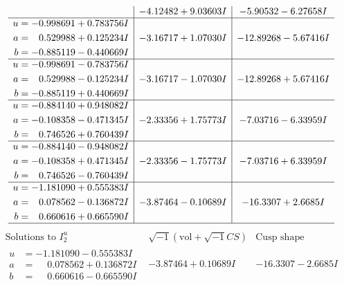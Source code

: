 \documentclass[1p]{elsarticle_modified}
\theoremstyle{definition}
\newcommand{\I}{\sqrt{-1}}
\begin{document}
$$\begin{array}{c|c|c}
 & -4.12482 + 9.03603 I & -5.90532 - 6.27658 I \\ \hline\begin{aligned}
u &= -0.998691 + 0.783756 I \\
a &= \phantom{-}0.529988 + 0.125234 I \\
b &= -0.885119 - 0.440669 I\end{aligned}
 & -3.16717 + 1.07030 I & -12.89268 - 5.67416 I \\ \hline\begin{aligned}
u &= -0.998691 - 0.783756 I \\
a &= \phantom{-}0.529988 - 0.125234 I \\
b &= -0.885119 + 0.440669 I\end{aligned}
 & -3.16717 - 1.07030 I & -12.89268 + 5.67416 I \\ \hline\begin{aligned}
u &= -0.884140 + 0.948082 I \\
a &= -0.108358 - 0.471345 I \\
b &= \phantom{-}0.746526 + 0.760439 I\end{aligned}
 & -2.33356 + 1.75773 I & -7.03716 - 6.33959 I \\ \hline\begin{aligned}
u &= -0.884140 - 0.948082 I \\
a &= -0.108358 + 0.471345 I \\
b &= \phantom{-}0.746526 - 0.760439 I\end{aligned}
 & -2.33356 - 1.75773 I & -7.03716 + 6.33959 I \\ \hline\begin{aligned}
u &= -1.181090 + 0.555383 I \\
a &= \phantom{-}0.078562 - 0.136872 I \\
b &= \phantom{-}0.660616 + 0.665590 I\end{aligned}
 & -3.87464 - 0.10689 I & -16.3307 + 2.6685 I\\
 \hline 
 \end{array}$$\newpage$$\begin{array}{c|c|c}  
\text{Solutions to }I^u_{2}& \I (\text{vol} + \sqrt{-1}CS) & \text{Cusp shape}\\
 \hline 
\begin{aligned}
u &= -1.181090 - 0.555383 I \\
a &= \phantom{-}0.078562 + 0.136872 I \\
b &= \phantom{-}0.660616 - 0.665590 I\end{aligned}
 & -3.87464 + 0.10689 I & -16.3307 - 2.6685 I \\ \hline\begin{aligned}

\end{aligned}
\end{array}$$
\end{document}
